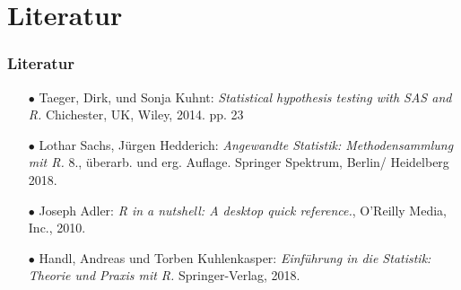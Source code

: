 \documentclass{beamer}
\begin{document}
\section{Literatur}
\frame{\sectionpage}
\begin{frame}
\frametitle{Literatur}
 \begin{itemize}
\item[$\bullet$] Taeger, Dirk, und Sonja Kuhnt: \textit{Statistical hypothesis testing with SAS and R.} Chichester, UK, Wiley, 2014. pp. 23\\
\item[$\bullet$] Lothar Sachs, Jürgen Hedderich: \textit{Angewandte Statistik: Methodensammlung mit R.} 8., überarb. und erg. Auflage. Springer Spektrum, Berlin/ Heidelberg 2018.\\
\item[$\bullet$] Joseph Adler: \textit{R in a nutshell: A desktop quick reference.}, O'Reilly Media, Inc., 2010.\\
\item[$\bullet$] Handl, Andreas und Torben Kuhlenkasper: \textit{Einführung in die Statistik: Theorie und Praxis mit R.} Springer-Verlag, 2018.


\end{itemize}

\end{frame}





\end{document}
